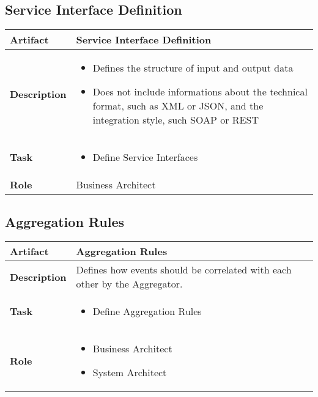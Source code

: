 \subsection{Service Interface Definition}
\begin{tabularx}{\textwidth}{@{} l X @{}}
	\caption{Service Interface Definition} \label{table:ch6_Artifact_Service_Interface_Definition}\\
	\toprule 
	\bfseries Artifact & Service Interface Definition\\
	\midrule 
	\bfseries Description & 
	\begin{itemize}
		\item Defines the structure of input and output data
		\item Does not include informations about the technical format, such as \ac{XML} or \ac{JSON}, and the integration style, such SOAP or \ac{REST}
	\end{itemize}
	\\
	\midrule 
	\bfseries Task & 
	\begin{itemize}
		\item Define Service Interfaces 
	\end{itemize}
	\\
	\midrule 
	\bfseries Role & Business Architect\\
	\bottomrule 
\end{tabularx}

\subsection{Aggregation Rules}

\begin{tabularx}{\textwidth}{@{} l X @{}}
	\caption{Aggregation Rules} \label{table:ch6_Artifact_Aggregation_Rules}\\
	\toprule 
	\bfseries Artifact & Aggregation Rules\\
	\midrule 
	\bfseries Description & Defines how events should be correlated with each other by the Aggregator.\\
	\midrule 
	\bfseries Task & 
	\begin{itemize}
		\item Define Aggregation Rules
	\end{itemize}
	\\
	\midrule 
	\bfseries Role & 
	\begin{itemize}
		\item Business Architect
		\item System Architect
	\end{itemize}
	\\
	\bottomrule 
\end{tabularx}


